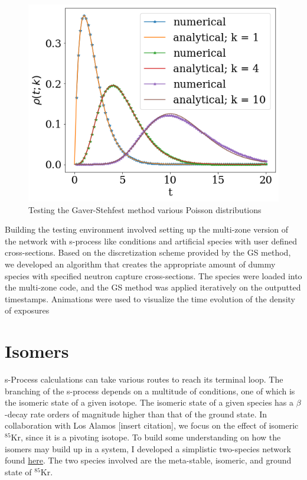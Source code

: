 \documentclass{article}
\begin{document}
\begin{figure}[!htp]
    \centerline{\includegraphics[scale = 0.5]{images/poisson_test.png}}
    \caption{Testing the Gaver-Stehfest method various Poisson distributions}
    \label{fig 3}
\end{figure}


Building the testing environment involved setting up the multi-zone version of the network with s-process like conditions and artificial 
species with user defined cross-sections. Based on the discretization scheme provided by the GS method, we developed an algorithm 
that creates the appropriate amount of dummy species with specified neutron capture cross-sections. The species were loaded into the 
multi-zone code, and the GS method was applied iteratively on the outputted timestamps. Animations were used to visualize the time 
evolution of the density of exposures 

\section*{Isomers}

s-Process calculations can take various routes to reach its terminal loop. The branching of the s-process depends on a multitude of 
conditions, one of which is the isomeric state of a given isotope. The isomeric state of a given species has a $\beta$-decay rate 
orders of magnitude higher than that of the ground state. In collaboration with Los Alamos [insert citation], we focus on the 
effect of isomeric $^{85}$Kr, since it is a pivoting isotope. To build some understanding on how the isomers may build up in a system, 
I developed a simplistic two-species network found \href{https://github.com/jaadt7/isomer_intuition}{here}.
The two species involved are the meta-stable, isomeric, and ground state of $^{85}$Kr.\\ 
\end{document}

